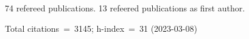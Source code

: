 74 refereed publications. 13 refeered publications as first author.

Total citations~=~3145; h-index~=~31 (2023-03-08)